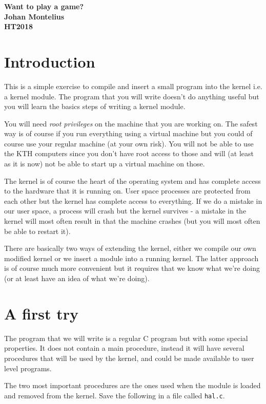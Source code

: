 \documentclass[a4paper,11pt]{article}
\newcommand{\nnsection}[1]{
\section*{#1} \addcontentsline{toc}{section}{#1} }
\begin{document}
\begin{center} \vspace{20pt} \textbf{\large Want to play a game?}\\
\vspace{10pt} \textbf{Johan Montelius}\\ \vspace{10pt} \textbf{HT2018}
\end{center}

\nnsection{Introduction}

This is a simple exercise to compile and insert a small program into
the kernel i.e. a kernel module. The program that you will write
doesn't do anything useful but you will learn the basics steps of
writing a kernel module.

You will need {\em root privileges} on the machine that you are working
on. The safest way is of course if you run everything using a virtual
machine but you could of course use your regular machine (at your own
risk). You will not be able to use the KTH computers since you don't
have root access to those and will (at least as it is now) not be able
to start up a virtual machine on those.

The kernel is of course the heart of the operating system and has
complete access to the hardware that it is running on. User space
processes are protected from each other but the kernel has complete
access to everything. If we do a mistake in our user space, a process
will crash but the kernel survives - a mistake in the kernel will most
often result in that the machine crashes (but you will most often be able
to restart it).

There are basically two ways of extending the kernel, either we
compile our own modified kernel or we insert a module into a running
kernel. The latter approach is of course much more convenient but it
requires that we know what we're doing (or at least have an idea of
what we're doing).

\section{A first try}

The program that we will write is a regular C program but with some special
properties. It does not contain a main procedure, instead it will have
several procedures that will be used by the kernel, and could be made
available to user level programs.

The two most important procedures are the ones used when the module is
loaded and removed from the kernel. Save the following in a file
called {\tt hal.c}.
\end{document}

